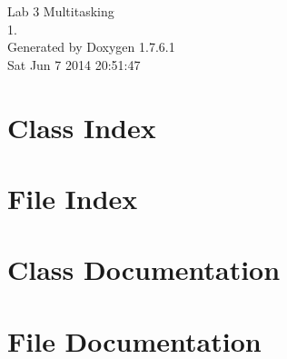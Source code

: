 \documentclass[letterpaper]{book}
\begin{document}
\hypersetup{pageanchor=false,citecolor=blue}
\begin{titlepage}
\vspace*{7cm}
\begin{center}
{\Large \-Lab 3 \-Multitasking \\[1ex]\large 1. }\\
\vspace*{1cm}
{\large \-Generated by Doxygen 1.7.6.1}\\
\vspace*{0.5cm}
{\small Sat Jun 7 2014 20:51:47}\\
\end{center}
\end{titlepage}
\clearemptydoublepage
{}
\tableofcontents
\clearemptydoublepage
{}
\hypersetup{pageanchor=true,citecolor=blue}
\chapter{\-Class \-Index}

\chapter{\-File \-Index}

\chapter{\-Class \-Documentation}











\chapter{\-File \-Documentation}














\printindex
\end{document}
